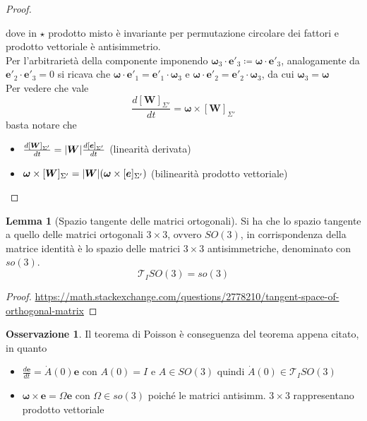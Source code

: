 \documentclass[a4paper,10pt]{article}
\theoremstyle{definition}
\newcommand{\bv}{\boldsymbol} %
\theoremstyle{indentdefinition}
\theoremstyle{indenttheorem}
\newtheorem{lem*}{Lemma}
\theoremstyle{myremark}
\newtheorem*{rem*}{Osservazione}
\theoremstyle{indentgeneral}
\begin{document}
\begin{proof}
\begin{itemize}
dove in $\star$ prodotto  misto è  invariante per permutazione circolare dei fattori e prodotto vettoriale è antisimmetrio. \\
Per l'arbitrarietà della componente imponendo $\boldsymbol{\omega}_{3}\cdot\boldsymbol{e}'_{3}\coloneqq\boldsymbol{\omega}\cdot\boldsymbol{e}'_{3}$,
analogamente  da $\boldsymbol{e}'_{2}\cdot\boldsymbol{e}'_{3}=0$ si ricava che $\boldsymbol{\omega}\cdot\boldsymbol{e}'_{1}=\boldsymbol{e}'_{1}\cdot\boldsymbol{\omega}_{3}$
e $\boldsymbol{\omega}\cdot\boldsymbol{e}'_{2}=\boldsymbol{e}'_{2}\cdot\boldsymbol{\omega}_{3}$,
da cui $\boxed{\boldsymbol{\omega}_{3}=\boldsymbol{\omega}}$ \\
Per vedere che vale $$\frac{d[\boldsymbol{W}]_{\Sigma'}}{dt}=\boldsymbol{\omega}\times[\boldsymbol{W}]_{\Sigma'}$$
basta notare che
\begin{itemize}
    \item $\frac{d[\boldsymbol{W}]_{\Sigma'}}{dt}=\abs{\bv{W}}\frac{d[\boldsymbol{e}]_{\Sigma'}}{dt}$ (linearità derivata)
    \item $\boldsymbol{\omega}\times[\boldsymbol{W}]_{\Sigma'}=\abs{\bv{W}}(\boldsymbol{\omega}\times[\boldsymbol{e}]_{\Sigma'})$ (bilinearità prodotto vettoriale)
\end{itemize}
\end{itemize}
\end{proof}

\begin{lem*}[Spazio tangente delle matrici ortogonali]
    Si ha che lo spazio tangente a quello delle matrici ortogonali $3\times3$, ovvero $SO(3)$, in corrispondenza della matrice identità è lo spazio delle matrici $3\times3$ antisimmetriche, denominato con $so(3)$. 
    $$\mathcal{T}_ISO(3)=so(3)$$
\end{lem*}
\begin{proof}
    \url{https://math.stackexchange.com/questions/2778210/tangent-space-of-orthogonal-matrix}
\end{proof}

\begin{rem*}
    Il teorema di Poisson è conseguenza del teorema appena citato, in quanto 
    \begin{itemize}
        \item $\frac{d\boldsymbol{e}}{dt}=\dot{A}(0)\bv{e}$ con $A(0)=I$ e $A\in SO(3)$ quindi $\dot{A}(0)\in\mathcal{T}_ISO(3)$
        \item $\bv{\omega}\times\bv{e}=\Omega \bv{e}$ con $\Omega\in  so(3)$ poiché le matrici antisimm. $3\times 3$ rappresentano prodotto vettoriale
    \end{itemize}
\end{rem*}
\end{document}
